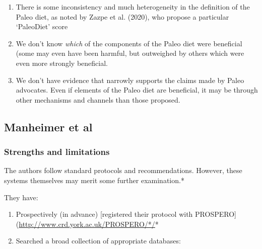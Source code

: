 \documentclass[]{tufte-handout}
\begin{document}
\begin{enumerate}
\def\labelenumi{\arabic{enumi}.}
\item
  There is some inconsistency and much heterogeneity in the definition
  of the Paleo diet, as noted by Zazpe et al. (2020), who propose a
  particular `PaleoDiet' score
\item
  We don't know \emph{which} of the components of the Paleo diet were
  beneficial (some may even have been harmful, but outweighed by others
  which were even more strongly beneficial.
\item
  We don't have evidence that narrowly supports the claims made by Paleo
  advocates. Even if elements of the Paleo diet are beneficial, it may
  be through other mechanisms and channels than those proposed.
\end{enumerate}

\hypertarget{manheimer}{%
\subsection{Manheimer et al}\label{manheimer}}

\hypertarget{strengths-and-limitations}{%
\subsubsection{Strengths and
limitations}\label{strengths-and-limitations}}

The authors follow standard protocols and recommendations. However,
these systems themselves may merit some further examination.*

They have:

\begin{enumerate}
\def\labelenumi{\arabic{enumi}.}
\item
  Prospectively (in advance) {[}registered their protocol with
  PROSPERO{]}(\url{http://www.crd.york.ac.uk/PROSPERO/*/}*
\item
  Searched a broad collection of appropriate databases:
\end{enumerate}
\end{document}
